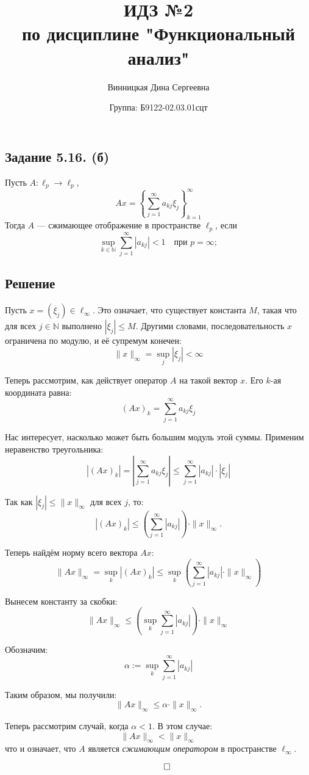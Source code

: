 \documentclass{article}
\title{\textbf{ИДЗ №2 \\ по дисциплине "Функциональный анализ"}}
\author{Винницкая Дина Сергеевна}
\date{Группа: Б9122-02.03.01сцт}
\begin{document}
	
	\maketitle

\subsection{Задание 5.16. (б)}
 Пусть $A: \ell_p \to \ell_p$, 
\[
Ax = \left\{ \sum_{j=1}^{\infty} a_{kj} \xi_j \right\}_{k=1}^{\infty}
\]
Тогда $A$ — сжимающее отображение в пространстве $\ell_p$, если
    \[
    \sup_{k \in \mathbb{N}} \sum_{j=1}^{\infty} |a_{kj}| < 1 \quad \text{при } p = \infty;
    \]

\subsection{Решение}

Пусть $x = (\xi_j) \in \ell_\infty$. Это означает, что существует константа $M$, такая что для всех $j \in \mathbb{N}$ выполнено $|\xi_j| \leq M$. Другими словами, последовательность $x$ ограничена по модулю, и её супремум конечен:
\[
\|x\|_\infty = \sup_j |\xi_j| < \infty
\]

Теперь рассмотрим, как действует оператор $A$ на такой вектор $x$. Его $k$-ая координата равна:
\[
(Ax)_k = \sum_{j=1}^\infty a_{kj} \xi_j
\]

Нас интересует, насколько может быть большим модуль этой суммы. Применим неравенство треугольника:
\[
|(Ax)_k| = \left| \sum_{j=1}^\infty a_{kj} \xi_j \right| \leq \sum_{j=1}^\infty |a_{kj}| \cdot |\xi_j|
\]

Так как $|\xi_j| \leq \|x\|_\infty$ для всех $j$, то:
\[
|(Ax)_k| \leq \left( \sum_{j=1}^\infty |a_{kj}| \right) \cdot \|x\|_\infty.
\]

Теперь найдём норму всего вектора $Ax$:
\[
\|Ax\|_\infty = \sup_k |(Ax)_k| \leq \sup_k \left( \sum_{j=1}^\infty |a_{kj}| \cdot \|x\|_\infty \right)
\]

Вынесем константу за скобки:
\[
\|Ax\|_\infty \leq \left( \sup_k \sum_{j=1}^\infty |a_{kj}| \right) \cdot \|x\|_\infty
\]

Обозначим:
\[
\alpha := \sup_k \sum_{j=1}^\infty |a_{kj}|
\]

Таким образом, мы получили:
\[
\|Ax\|_\infty \leq \alpha \cdot \|x\|_\infty.
\]

Теперь рассмотрим случай, когда $\alpha < 1$. В этом случае:
\[
\|Ax\|_\infty < \|x\|_\infty
\]
что и означает, что $A$ является \textit{сжимающим оператором} в пространстве $\ell_\infty$.

$$\qed$$
\end{document}
